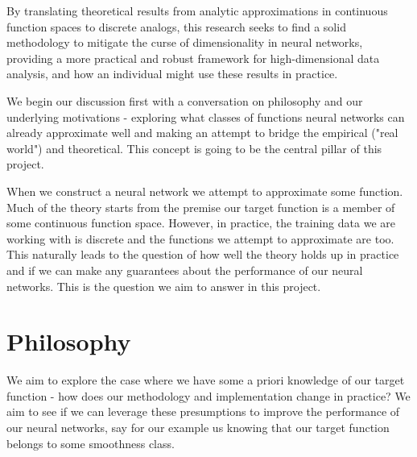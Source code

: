 \documentclass[11pt,a4paper]{article}
\begin{document}
By translating theoretical results from analytic approximations in continuous function spaces to discrete analogs, this research seeks to find a solid methodology to mitigate the curse of dimensionality in neural networks, providing a more practical and robust framework for high-dimensional data analysis, and how an individual might use these results in practice.

We begin our discussion first with a conversation on philosophy and our underlying motivations - exploring what classes of functions neural networks can already approximate well and making an attempt to bridge the empirical ("real world") and theoretical. This concept is going to be the central pillar of this project.

When we construct a neural network we attempt to approximate some function. Much of the theory starts from the premise our target function is a member of some continuous function space. However, in practice, the training data we are working with is discrete and the functions we attempt to approximate are too. This naturally leads to the question of how well the theory holds up in practice and if we can make any guarantees about the performance of our neural networks. This is the question we aim to answer in this project.

\section{Philosophy}
We aim to explore the case where we have some a priori knowledge of our target function - how does our methodology and implementation change in practice? We aim to see if we can leverage these presumptions to improve the performance of our neural networks, say for our example us knowing that our target function belongs to some smoothness class.
\end{document}
